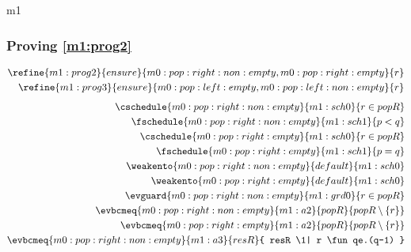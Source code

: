 \documentclass[12pt]{amsart}
\begin{document}
\begin{machine}{m1}
\subsubsection{Proving \ref{m1:prog2}}
\begin{align*}
	\refine{m1:prog2}{ensure}{m0:pop:right:non:empty,m0:pop:right:empty
	}{ \index{r}{r} }
	\\ \refine{m1:prog3}{ensure}{m0:pop:left:empty,m0:pop:left:non:empty}
	{ \index{r}{r} }
\end{align*}
\begin{align*}
\cschedule{m0:pop:right:non:empty}{m1:sch0}{ r \in popR }
\\ \fschedule{m0:pop:right:non:empty}{m1:sch1}{ p < q }
\\ \cschedule{m0:pop:right:empty}{m1:sch0}{ r \in popR }
\\ \fschedule{m0:pop:right:empty}{m1:sch1}{ p = q }
\\ \weakento{m0:pop:right:non:empty}{default}{m1:sch0}
\\ \weakento{m0:pop:right:empty}{default}{m1:sch0}
\\ \evguard{m0:pop:right:non:empty}{m1:grd0}{ r \in popR }
\\ \evbcmeq{m0:pop:right:non:empty}{m1:a2}
	{popR}{ popR \setminus \{ r \} }
\\ \evbcmeq{m0:pop:right:empty}{m1:a2}
	{popR}{ popR \setminus \{ r \} }
\\ \evbcmeq{m0:pop:right:non:empty}{m1:a3}
	{resR}{ resR \1| r \fun qe.(q-1) }
\end{align*}

\end{machine}
\end{document}
